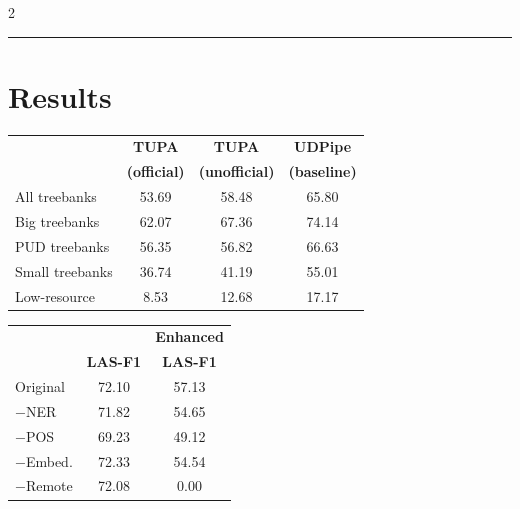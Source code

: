 \documentclass[a0,portrait]{a0poster}
\begin{document}
\begin{multicols}{2}
\vfill
\hrule


\section*{Results}

\begin{minipage}{.5\columnwidth}
	\begin{tabular}{lccc}
	& \bf TUPA & \bf TUPA & \bf UDPipe \\
	& \bf \small(official) & \bf \small(unofficial) & \bf \small(baseline) \\
	All treebanks & 53.69 & 58.48 & 65.80 \\
	Big treebanks & 62.07 & 67.36 & 74.14 \\
	PUD treebanks & 56.35 & 56.82 & 66.63 \\
	Small treebanks & 36.74 & 41.19 & 55.01 \\
	Low-resource & 8.53 & 12.68 & 17.17
	\end{tabular}
\end{minipage}
\hfill
\begin{minipage}{.4\columnwidth}
	\begin{tabular}{lcc}
	& & \bf Enhanced \\
	& \bf LAS-F1 & \bf LAS-F1 \\
	Original & 72.10 & 57.13 \\
	$-$NER & 71.82 & 54.65\\ 
	$-$POS & 69.23 & 49.12\\ 
	$-$Embed. & 72.33 & 54.54\\ 
	$-$Remote & 72.08 & 0.00\\ 
	\end{tabular}
\end{minipage}


{
\setlength{\columnsep}{5mm}
\setlength{\columnseprule}{0pt}
}
\end{multicols}
\end{document}
